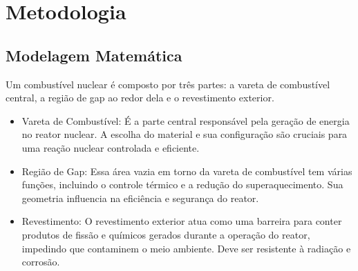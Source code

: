 \chapter{Metodologia} \label{chap:methodology}

\section{Modelagem Matemática}

Um combustível nuclear é composto por três partes: a vareta de combustível central, a região de gap ao redor dela e o revestimento exterior.

\begin{itemize}
    \item Vareta de Combustível: É a parte central responsável pela geração de energia no reator nuclear. A escolha do material e sua configuração são cruciais para uma reação nuclear controlada e eficiente.

    \item Região de Gap: Essa área vazia em torno da vareta de combustível tem várias funções, incluindo o controle térmico e a redução do superaquecimento. Sua geometria influencia na eficiência e segurança do reator.

    \item Revestimento: O revestimento exterior atua como uma barreira para conter produtos de fissão e químicos gerados durante a operação do reator, impedindo que contaminem o meio ambiente. Deve ser resistente à radiação e corrosão.
\end{itemize}

